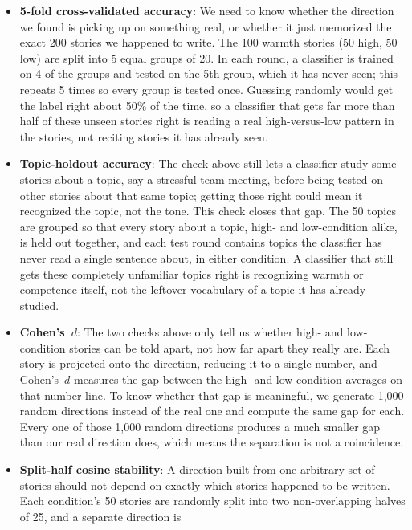 \documentclass[twocolumn]{article}
\begin{document}
\begin{appendices}
\begin{itemize}[leftmargin=*, itemsep=2pt, topsep=4pt, parsep=0pt]
  \item \textbf{5-fold cross-validated accuracy}: We need to know whether
  the direction we found is picking up on something real, or whether it
  just memorized the exact 200 stories we happened to write. The 100
  warmth stories (50 high, 50 low) are split into 5 equal groups of 20. In
  each round, a classifier is trained on 4 of the groups and tested on the
  5th group, which it has never seen; this repeats 5 times so every group
  is tested once. Guessing randomly would get the label right about 50\%
  of the time, so a classifier that gets far more than half of these
  unseen stories right is reading a real high-versus-low pattern in the
  stories, not reciting stories it has already seen.
  \item \textbf{Topic-holdout accuracy}: The check above still lets a
  classifier study some stories about a topic, say a stressful team
  meeting, before being tested on other stories about that same topic;
  getting those right could mean it recognized the topic, not the tone.
  This check closes that gap. The 50 topics are grouped so that every
  story about a topic, high- and low-condition alike, is held out
  together, and each test round contains topics the classifier has never
  read a single sentence about, in either condition. A classifier that
  still gets these completely unfamiliar topics right is recognizing
  warmth or competence itself, not the leftover vocabulary of a topic it
  has already studied.
  \item \textbf{Cohen's~$d$}: The two checks above only tell us whether
  high- and low-condition stories can be told apart, not how far apart
  they really are. Each story is projected onto the direction, reducing
  it to a single number, and Cohen's~$d$ measures the gap between the
  high- and low-condition averages on that number line. To know whether
  that gap is meaningful, we generate 1,000 random directions instead of
  the real one and compute the same gap for each. Every one of those
  1,000 random directions produces a much smaller gap than our real
  direction does, which means the separation is not a coincidence.
  \item \textbf{Split-half cosine stability}: A direction built from one
  arbitrary set of stories should not depend on exactly which stories
  happened to be written. Each condition's 50 stories are randomly split
  into two non-overlapping halves of 25, and a separate direction is

\end{itemize}
\end{appendices}
\end{document}
